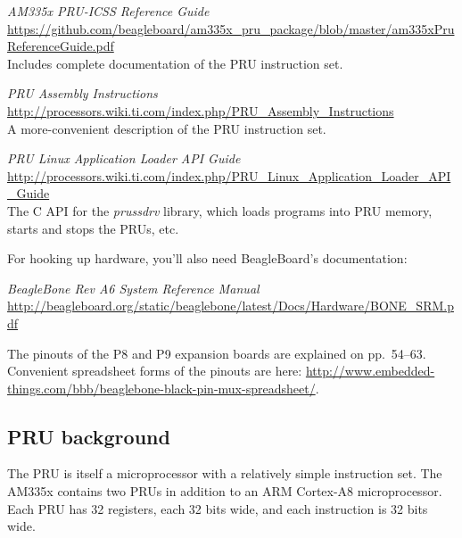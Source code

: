 \documentclass[letterpaper,11pt,fleqn]{article}
\newenvironment{docref}
   {\vspace{\baselineskip}\noindent\begin{minipage}{\textwidth}\raggedright}
   {\end{minipage}}
\begin{document}
\begin{docref}
\textit{AM335x PRU-ICSS Reference Guide} \\
\url{https://github.com/beagleboard/am335x\_pru\_package/blob/master/am335xPruReferenceGuide.pdf} \\
Includes complete documentation of the PRU instruction set.
\end{docref}

\begin{docref}
\textit{PRU Assembly Instructions} \\
\url{http://processors.wiki.ti.com/index.php/PRU\_Assembly\_Instructions} \\
A more-convenient description of the PRU instruction set.
\end{docref}

\begin{docref}
\textit{PRU Linux Application Loader API Guide} \\
\url{http://processors.wiki.ti.com/index.php/PRU\_Linux\_Application\_Loader\_API\_Guide} \\
The C API for the \textit{prussdrv} library, which loads programs into
PRU memory, starts and stops the PRUs, etc.
\end{docref}

\vspace{\baselineskip}
\noindent
For hooking up hardware, you'll also need BeagleBoard's
documentation:

\begin{docref}
\textit{BeagleBone Rev A6 System Reference Manual} \\
\url{http://beagleboard.org/static/beaglebone/latest/Docs/Hardware/BONE\_SRM.pdf}
\end{docref}

\vspace{\baselineskip}
\noindent
The pinouts of the P8 and P9 expansion boards are explained on pp.~54--63.
Convenient spreadsheet forms of the pinouts are here:
\url{http://www.embedded-things.com/bbb/beaglebone-black-pin-mux-spreadsheet/}.

\subsection{PRU background}

The PRU is itself a microprocessor with a relatively simple instruction set.
The AM335x contains two PRUs in addition to an ARM Cortex-A8 microprocessor.
Each PRU has 32 registers, each 32 bits wide, and each instruction is 32 bits
wide.
\end{document}
